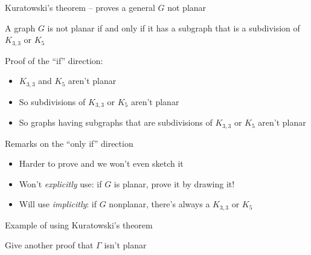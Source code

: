 \documentclass{beamer}
\begin{document}
\begin{frame}{Kuratowski's theorem -- proves a general $G$ not planar}
\begin{theorem} A graph $G$ is not planar if and only if it has a subgraph that is a subdivision of $K_{3,3}$ or $K_5$    
    \end{theorem}

\begin{block}{Proof of the ``if'' direction:}
\begin{itemize}
    \item $K_{3,3}$ and $K_5$ aren't planar
    \item So subdivisions of $K_{3,3}$ or $K_5$ aren't planar
    \item So graphs having subgraphs that are subdivisions of $K_{3,3}$ or $K_5$ aren't planar
\end{itemize}
\end{block}
\begin{block}{Remarks on the ``only if'' direction}
  \begin{itemize}
  \item Harder to prove and we won't even sketch it
  \item Won't \emph{explicitly} use: if $G$ is planar, prove it by drawing it!
  \item Will use \emph{implicitly}: if $G$ nonplanar, there's always a $K_{3,3}$ or $K_5$ 
    \end{itemize}
\end{block}


    
\end{frame}

\begin{frame}{Example of using Kuratowski's theorem}

  \begin{center}
\end{center}
  \begin{block}{Give another proof that $\Gamma$ isn't planar}

    \end{block}


  \end{frame}
\end{document}
